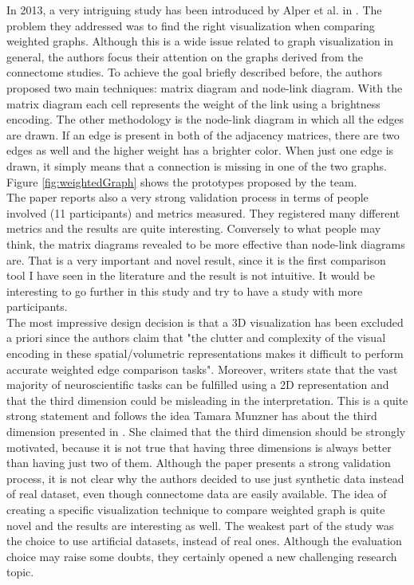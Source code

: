 \documentclass{article}
\begin{document}
\begin{multicols}{2}
In 2013, a very intriguing study has been introduced by Alper et al. in \cite{weightedGraphComparison}. The problem they addressed was to find the right visualization when comparing weighted graphs. Although this is a wide issue related to graph visualization in general, the authors focus their attention on the graphs derived from the connectome studies. To achieve the goal briefly described before, the authors proposed two main techniques: matrix diagram and node-link diagram. With the matrix diagram each cell represents the weight of the link using a brightness encoding. The other methodology is the node-link diagram in which all the edges are drawn. If an edge is present in both of the adjacency matrices, there are two edges as well and the higher weight has a brighter color. When just one edge is drawn, it simply means that a connection is missing in one of the two graphs. Figure \ref{fig:weightedGraph} shows the prototypes proposed by the team.\\
The paper reports also a very strong validation process in terms of people involved (11 participants) and metrics measured. They registered many different metrics and the results are quite interesting. Conversely to what people may think, the matrix diagrams revealed to be more effective than node-link diagrams are. That is a very important and novel result, since it is the first comparison tool I have seen in the literature and the result is not intuitive. It would be interesting to go further in this study and try to have a study with more participants.\\
The most impressive design decision is that a 3D visualization has been excluded a priori since the authors claim that "the clutter and complexity of the visual encoding in these spatial/volumetric representations makes it difficult to perform accurate weighted edge comparison tasks". Moreover, writers state that the vast majority of neuroscientific tasks can be fulfilled using a 2D representation and that the third dimension could be misleading in the interpretation. This is a quite strong statement and follows the idea Tamara Munzner has about the third dimension presented in \cite{processAndPitfalls}. She claimed that the third dimension should be strongly motivated, because it is not true that having three dimensions is always better than having just two of them. Although the paper presents a strong validation process, it is not clear why the authors decided to use just synthetic data instead of real dataset, even though connectome data are easily available. The idea of creating a specific visualization technique to compare weighted graph is quite novel and the results are interesting as well. The weakest part of the study was the choice to use artificial datasets, instead of real ones. Although the evaluation choice may raise some doubts, they certainly opened a new challenging research topic.


\end{multicols}
\end{document}
